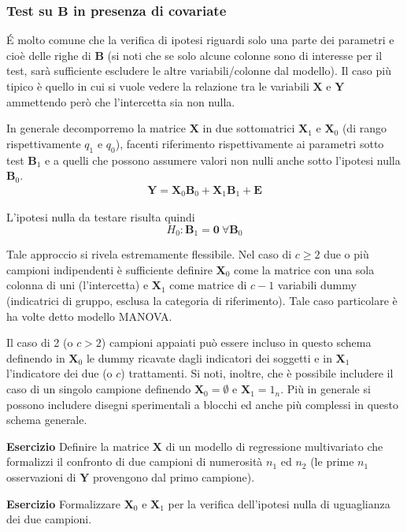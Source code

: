 \documentclass[10pt]{article}
\newcommand{\bfB}{\mathbf{B}}
\newcommand{\XX}{\mathbf{X}}
\newcommand{\YY}{\mathbf{Y}}
\newcommand{\zeros}{\mathbf{0}}
\begin{document}
\subsubsection{Test su $\bfB$ in presenza di covariate}
\'E molto comune che la verifica di ipotesi riguardi solo una parte dei parametri e cioè delle righe di $\bfB$ (si noti che se solo alcune colonne sono di interesse per il test, sarà sufficiente escludere le altre variabili/colonne dal modello).
Il caso più tipico è quello in cui si vuole vedere la relazione tra le variabili $\XX$ e $\YY$ ammettendo però che l'intercetta sia non nulla.

In generale decomporremo la matrice $\XX$ in due sottomatrici $\XX_1$ e $\XX_0$ (di rango rispettivamente $q_1$ e $q_0$), facenti riferimento rispettivamente ai parametri sotto test $\bfB_1$ e a quelli che possono assumere valori non nulli anche sotto l'ipotesi nulla $\bfB_0$.
\begin{eqnarray}\label{full}
\mathbf{\YY} = \XX_0\bfB_0 +  \XX_1\bfB_1 + \mathbf{E}
\end{eqnarray}

L'ipotesi nulla da testare risulta quindi 
$$H_0: \bfB_1=\zeros \ \forall \bfB_0$$

\bigskip
Tale approccio si rivela estremamente flessibile. Nel caso di $c\geq 2$ due o più campioni indipendenti è sufficiente definire $\XX_0$ come la matrice con una sola colonna di uni (l'intercetta) e $\XX_1$ come matrice di $c-1$ variabili dummy (indicatrici di gruppo, esclusa la categoria di riferimento). Tale caso particolare è ha volte detto modello MANOVA.

Il caso di 2 (o $c>2$) campioni appaiati può essere incluso in questo schema definendo in $\XX_0$ le dummy ricavate dagli indicatori dei soggetti e in $\XX_1$ l'indicatore dei due (o $c$) trattamenti.
Si noti, inoltre, che è possibile includere il caso di un singolo campione definendo $\XX_0=\emptyset$  e $\XX_1=1_n$.
Più in generale si possono includere disegni sperimentali a blocchi ed anche più complessi in questo schema generale.



{\bf Esercizio} Definire la matrice $\XX$ di un modello di regressione multivariato che formalizzi il confronto di due campioni di numerosità $n_1$ ed $n_2$ (le prime $n_1$ osservazioni di $\YY$ provengono dal primo campione).

{\bf Esercizio} Formalizzare $\XX_0$ e $\XX_1$ per la verifica dell'ipotesi nulla di uguaglianza dei due campioni.
\end{document}
